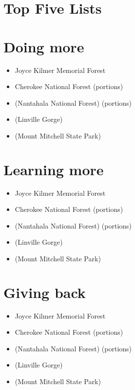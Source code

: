 \documentclass[
]{book}
\providecommand{\tightlist}{%
  \setlength{\itemsep}{0pt}\setlength{\parskip}{0pt}}
\begin{document}
\hypertarget{top-lists}{%
\chapter{Top Five Lists}\label{top-lists}}

\hypertarget{doing-more}{%
\chapter{Doing more}\label{doing-more}}

\begin{itemize}
\tightlist
\item
  Joyce Kilmer Memorial Forest
\item
  Cherokee National Forest (portions)
\item
  (Nantahala National Forest) (portions)
\item
  (Linville Gorge)
\item
  (Mount Mitchell State Park)
\end{itemize}

\hypertarget{learning-more}{%
\chapter{Learning more}\label{learning-more}}

\begin{itemize}
\tightlist
\item
  Joyce Kilmer Memorial Forest
\item
  Cherokee National Forest (portions)
\item
  (Nantahala National Forest) (portions)
\item
  (Linville Gorge)
\item
  (Mount Mitchell State Park)
\end{itemize}

\hypertarget{giving-back}{%
\chapter{Giving back}\label{giving-back}}

\begin{itemize}
\tightlist
\item
  Joyce Kilmer Memorial Forest
\item
  Cherokee National Forest (portions)
\item
  (Nantahala National Forest) (portions)
\item
  (Linville Gorge)
\item
  (Mount Mitchell State Park)
\end{itemize}
\end{document}
